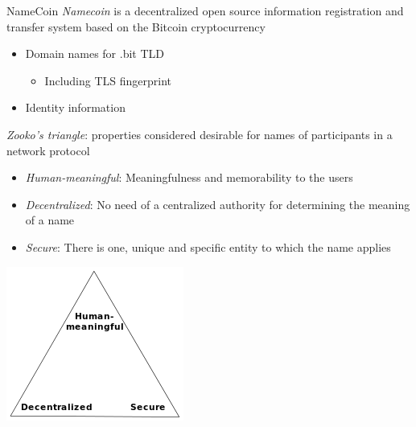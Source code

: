 \documentclass[11pt]{beamer}
\begin{document}
\begin{frame}{NameCoin}
\emph{Namecoin} is a decentralized open source information registration and transfer system based on the Bitcoin cryptocurrency
\begin{itemize}
\item Domain names for .bit TLD
\begin{itemize}
\item Including TLS fingerprint
\end{itemize}
\item Identity information 
\end{itemize}
\pause
\emph{Zooko's triangle}: properties considered desirable for names of participants in a network protocol
\begin{itemize}
\item \emph{Human-meaningful}: Meaningfulness and memorability to the users
\item \emph{Decentralized}: No need of a centralized authority for determining the meaning of a name
\item \emph{Secure}: There is one, unique and specific entity to which the name applies
\end{itemize}
\includegraphics[scale=0.2]{zooko_triangle.png}
\end{frame}
\end{document}

